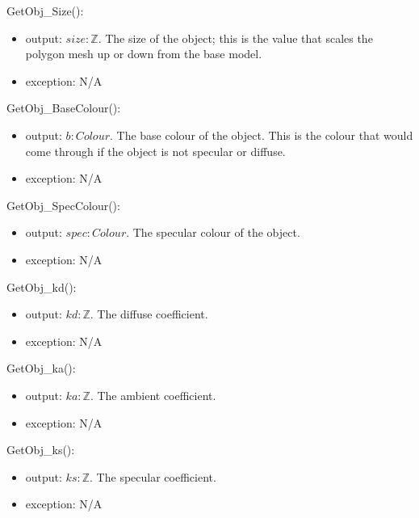 \documentclass[12pt, titlepage]{article}
\begin{document}
\noindent GetObj\_Size():
\begin{itemize}
	\item output: $size : \mathbb{Z}$. The size of the object; this is the 
	value that scales the polygon mesh up or down from the base model.
	\item exception: N/A
\end{itemize}

\noindent GetObj\_BaseColour():
\begin{itemize}
	\item output: $b : Colour$. The base colour of the object. This is the 
	colour that would come through if the object is not specular or diffuse.
	\item exception: N/A
\end{itemize}

\noindent GetObj\_SpecColour():
\begin{itemize}
	\item output: $spec : Colour$. The specular colour of the object.
	\item exception: N/A
\end{itemize}

\noindent GetObj\_kd():
\begin{itemize}
	\item output: $kd : \mathbb{Z}$. The diffuse coefficient.
	\item exception: N/A
\end{itemize}

\noindent GetObj\_ka():
\begin{itemize}
	\item output: $ka : \mathbb{Z}$. The ambient coefficient.
	\item exception: N/A
\end{itemize}

\noindent GetObj\_ks():
\begin{itemize}
	\item output: $ks : \mathbb{Z}$. The specular coefficient.
	\item exception: N/A
\end{itemize}
\end{document}
